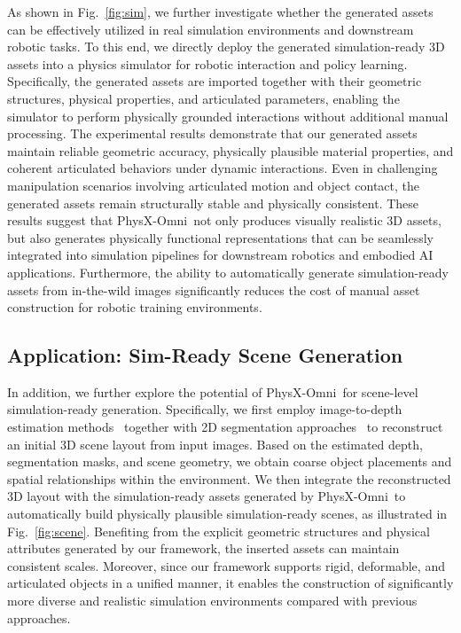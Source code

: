 \documentclass[11pt]{article}
\def\ourname{PhysX-Omni}
\begin{document}
As shown in Fig.~\ref{fig:sim}, we further investigate whether the generated assets can be effectively utilized in real simulation environments and downstream robotic tasks. To this end, we directly deploy the generated simulation-ready 3D assets into a physics simulator for robotic interaction and policy learning. Specifically, the generated assets are imported together with their geometric structures, physical properties, and articulated parameters, enabling the simulator to perform physically grounded interactions without additional manual processing. The experimental results  demonstrate that our generated assets maintain reliable geometric accuracy, physically plausible material properties, and coherent articulated behaviors under dynamic interactions. Even in challenging manipulation scenarios involving articulated motion and object contact, the generated assets remain structurally stable and physically consistent. These results suggest that \ourname\ not only produces visually realistic 3D assets, but also generates physically functional representations that can be seamlessly integrated into simulation pipelines for downstream robotics and embodied AI applications. Furthermore, the ability to automatically generate simulation-ready assets from in-the-wild images significantly reduces the cost of manual asset construction for robotic training environments.

\subsection{Application: Sim-Ready Scene Generation} 


In addition, we further explore the potential of \ourname\ for scene-level simulation-ready generation. Specifically, we first employ image-to-depth estimation methods~\cite{yang2024depth} together with 2D segmentation approaches~\cite{ravi2024sam} to reconstruct an initial 3D scene layout from input images. Based on the estimated depth, segmentation masks, and scene geometry, we obtain coarse object placements and spatial relationships within the environment. We then integrate the reconstructed 3D layout with the simulation-ready assets generated by \ourname\ to automatically build physically plausible simulation-ready scenes, as illustrated in Fig.~\ref{fig:scene}. Benefiting from the explicit geometric structures and physical attributes generated by our framework, the inserted assets can maintain consistent scales. Moreover, since our framework supports rigid, deformable, and articulated objects in a unified manner, it enables the construction of significantly more diverse and realistic simulation environments compared with previous approaches.
\end{document}
